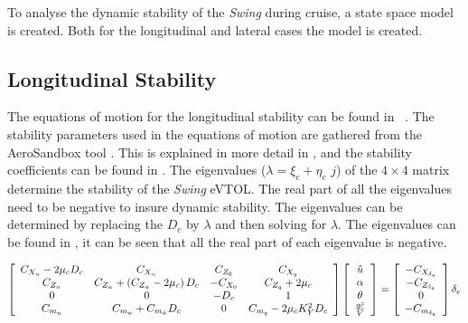 To analyse the dynamic stability of the \textit{Swing} during cruise, a state space model is created.
Both for the longitudinal and lateral cases the model is created.

\subsection{Longitudinal Stability}
\label{subsec:Longitudinal_Stability}

The equations of motion for the longitudinal stability can be found in ~\cite{FD_LectureNotes}.
The stability parameters used in the equations of motion are gathered from the AeroSandbox tool \cite{aerosandbox}.
This is explained in more detail in , and the stability coefficients can be found in .
The eigenvalues ($\lambda = \xi_c + \eta_c$ $j$) of the $4\times4$ matrix determine the stability of the \textit{Swing} eVTOL. The real part of all the eigenvalues need to be negative to insure dynamic stability.
The eigenvalues can be determined by replacing the $D_c$ by $\lambda$ and then solving for $\lambda$.
The eigenvalues can be found in , it can be seen that all the real part of each eigenvalue is negative.

\begin{equation}
    \label{eq:dynamic:EOM:Long}
     {\left[\begin{array}{cccc}
    C_{X_u}-2 \mu_c D_c & C_{X_\alpha} & C_{Z_0} & C_{X_q} \\
    C_{Z_u} & C_{Z_\alpha}+\left(C_{Z_{\dot{\alpha}}}-2 \mu_c\right) D_c & -C_{X_0} & C_{Z_q}+2 \mu_c \\
    0 & 0 & -D_c & 1 \\
    C_{m_u} & C_{m_\alpha}+C_{m_{\dot{\alpha}}} D_c & 0 & C_{m_q}-2 \mu_c K_Y^2 D_c
    \end{array}\right]\left[\begin{array}{c}
    \hat{u} \\
    \alpha \\
    \theta \\
    \frac{q \bar{c}}{V}
    \end{array}\right]} \\
     =\left[\begin{array}{c}
    -C_{X_{\delta_e}} \\
    -C_{Z_{\delta_e}} \\
    0 \\
    -C_{m_{\delta_e}}
    \end{array}\right] \delta_e
\end{equation}


